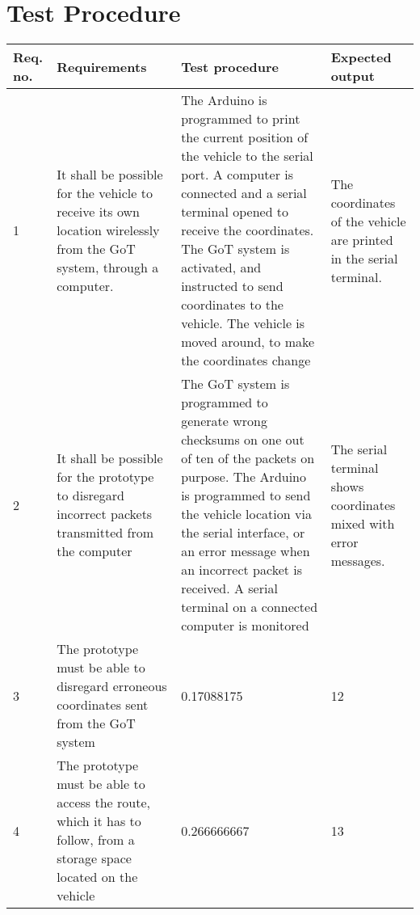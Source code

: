 \section{Test Procedure}\label{cha:TestProcedure}

\begin{table}[H] \centering
\begin{tabular}{|p{2cm}|p{5cm}|p{6cm}|p{3cm}|}
\hline%
\textbf{Req. no.}  &  \textbf{Requirements} &  \textbf{Test procedure}  &  \textbf{Expected output}        \\
\hline%
           1    &   It shall be possible for the vehicle to receive its own location wirelessly from the GoT system, through a computer.   &   The Arduino is programmed to print the current position of the vehicle to the serial port. A computer is connected and a serial terminal opened to receive the coordinates. The GoT system is activated, and instructed to send coordinates to the vehicle. The vehicle is moved around, to make the coordinates change   &   The coordinates of the vehicle are printed in the serial terminal.                \\
\hline%
           2    &   It shall be possible for the prototype to disregard incorrect packets transmitted from the computer   &   The GoT system is programmed to generate wrong checksums on one out of ten of the packets on purpose. The Arduino is programmed to send the vehicle location via the serial interface, or an error message when an incorrect packet is received. A serial terminal on a connected computer is monitored  &  The serial terminal shows coordinates mixed with error messages.              \\
\hline%
           3    &   The prototype must be able to disregard erroneous coordinates sent from the GoT system   &    0.17088175   &  12           \\
\hline%
           4    &   The prototype must be able to access the route, which it has to follow, from a storage space located on the vehicle &   0.266666667   &   13                  \\

\end{tabular}
\end{table}

